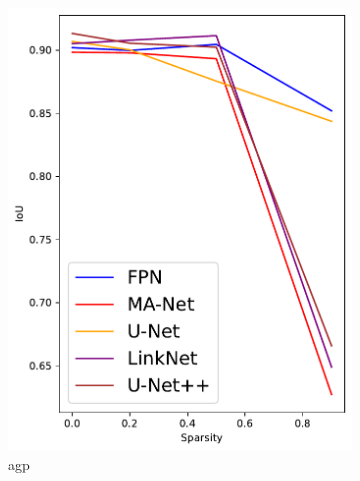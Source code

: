 \documentclass[mathematics,article,submit,pdftex,moreauthors]{Definitions/mdpi}
\begin{document}
\begin{figure}[!ht]
    \centering
      \begin{subfigure}[t]{.292\textwidth}
        \centering
        \includegraphics[width=.95\linewidth]{figures/test/pruning-testing-score_NEA_agp.pdf}
        \caption{\ac{agp}}
        \label{fig:results:test:nea:agp}
      \end{subfigure}
      \hfill
      \begin{subfigure}[t]{.28\textwidth}
        \centering

\end{subfigure}
\end{figure}
\end{document}
